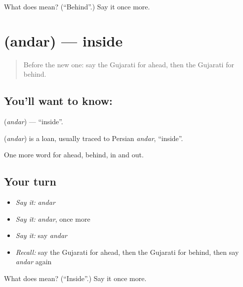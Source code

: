 \begin{tcolorbox}[breakable,colback=teal!4,colframe=teal!35!black,title={Before you move on}]
What does  mean? (\textquotedblleft{}Behind\textquotedblright{}.) Say it once more.
\end{tcolorbox}
\section[\texorpdfstring{\gu{અંદર} (andar)}{અંદર (andar)}]{ (andar) — inside}

\label{lesson:GU-C75-inside}



\begin{quote}
Before the new one: say the Gujarati for ahead, then the Gujarati for behind.
\end{quote}

\subsection*{You'll want to know: }
\textbf{} (\emph{andar}) — \textquotedblleft{}inside\textquotedblright{}.

\begin{cousinweb}
\textbf{} (\emph{andar}) is a loan, usually traced to Persian \emph{andar}, \textquotedblleft{}inside\textquotedblright{}.
\end{cousinweb}

\begin{grammarlens}[title={What you've built}]
One more word for ahead, behind, in and out.
\end{grammarlens}

\subsection*{Your turn}
\begin{itemize}
\raggedright
  \item \emph{Say it:} \emph{andar}
  \item \emph{Say it:} \emph{andar}, once more
  \item \emph{Say it:} say \emph{andar}
  \item \emph{Recall:} say the Gujarati for ahead, then the Gujarati for behind, then say \emph{andar} again
\end{itemize}

\begin{tcolorbox}[breakable,colback=teal!4,colframe=teal!35!black,title={Before you move on}]
What does  mean? (\textquotedblleft{}Inside\textquotedblright{}.) Say it once more.
\end{tcolorbox}
